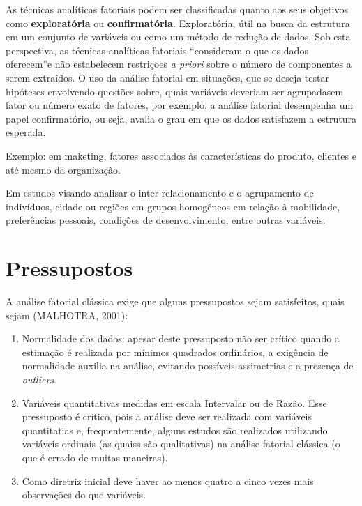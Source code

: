 \documentclass[12pt,brazil,oneside]{book}
\begin{document}
As técnicas analíticas fatoriais podem ser classificadas quanto aos seus
objetivos como \textbf{exploratória} ou \textbf{confirmatória}.
Exploratória, útil na busca da estrutura em um conjunto de variáveis ou
como um método de redução de dados. Sob esta perspectiva, as técnicas
analíticas fatoriais ``consideram o que os dados oferecem''e não
estabelecem restriçoes \emph{a priori} sobre o número de componentes a
serem extraídos. O uso da análise fatorial em situações, que se deseja
testar hipóteses envolvendo questões sobre, quais variáveis deveriam ser
agrupadasem fator ou número exato de fatores, por exemplo, a análise
fatorial desempenha um papel confirmatório, ou seja, avalia o grau em
que os dados satisfazem a estrutura esperada.

Exemplo: em maketing, fatores associados às características do produto,
clientes e até mesmo da organização.

Em estudos visando analisar o inter-relacionamento e o agrupamento de
indivíduos, cidade ou regiões em grupos homogêneos em relação à
mobilidade, preferências pessoais, condições de desenvolvimento, entre
outras variáveis.

\hypertarget{pressupostos}{%
\section{Pressupostos}\label{pressupostos}}

A análise fatorial clássica exige que alguns pressupostos sejam
satisfeitos, quais sejam (MALHOTRA, 2001):

\begin{enumerate}
\def\labelenumi{\alph{enumi}.}
\item
  Normalidade dos dados: apesar deste pressuposto não ser crítico quando
  a estimação é realizada por mínimos quadrados ordinários, a exigência
  de normalidade auxilia na análise, evitando possíveis assimetrias e a
  presença de \emph{outliers}.
\item
  Variáveis quantitativas medidas em escala Intervalar ou de Razão. Esse
  pressuposto é crítico, pois a análise deve ser realizada com variáveis
  quantitatias e, frequentemente, alguns estudos são realizados
  utilizando variáveis ordinais (as quaiss são qualitativas) na análise
  fatorial clássica (o que é errado de muitas maneiras).
\item
  Como diretriz inicial deve haver ao menos quatro a cinco vezes mais
  observações do que variáveis.
\end{enumerate}
\end{document}
